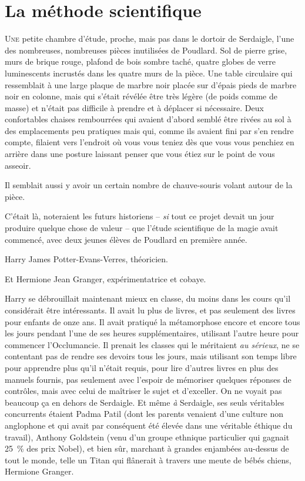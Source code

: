 \chapter{La méthode scientifique}

\lettrine{U}{ne} petite chambre d'étude, proche, mais pas dans le dortoir de Serdaigle, l'une des nombreuses, nombreuses pièces inutilisées de Poudlard.
Sol de pierre grise, murs de brique rouge, plafond de bois sombre taché, quatre globes de verre luminescents incrustés dans les quatre murs de la pièce.
Une table circulaire qui ressemblait à une large plaque de marbre noir placée sur d'épais pieds de marbre noir en colonne, mais qui s'était révélée être très légère (de poids comme de masse) et n'était pas difficile à prendre et à déplacer si nécessaire.
Deux confortables chaises rembourrées qui avaient d'abord semblé être rivées au sol à des emplacements peu pratiques mais qui, comme ils avaient fini par s'en rendre compte, filaient vers l'endroit où vous vous teniez dès que vous vous penchiez en arrière dans une posture laissant penser que vous étiez sur le point de vous asseoir.

Il semblait aussi y avoir un certain nombre de chauve-souris volant autour de la pièce.

C'était là, noteraient les futurs historiens -- \emph{si} tout ce projet devait un jour produire quelque chose de valeur -- que l'étude scientifique de la magie avait commencé, avec deux jeunes élèves de Poudlard en première année.

Harry James Potter-Evans-Verres, théoricien.

Et Hermione Jean Granger, expérimentatrice et cobaye.

Harry se débrouillait maintenant mieux en classe, du moins dans les cours qu'il considérait être intéressants.
Il avait lu plus de livres, et pas seulement des livres pour enfants de onze ans.
Il avait pratiqué la métamorphose encore et encore tous les jours pendant l'une de ses heures supplémentaires, utilisant l'autre heure pour commencer l'Occlumancie.
Il prenait les classes qui le méritaient \emph{au sérieux}, ne se contentant pas de rendre ses devoirs tous les jours, mais utilisant son temps libre pour apprendre plus qu'il n'était requis, pour lire d'autres livres en plus des manuels fournis, pas seulement avec l'espoir de mémoriser quelques réponses de contrôles, mais avec celui de maîtriser le sujet et d'exceller.
On ne voyait pas beaucoup ça en dehors de Serdaigle.
Et même \emph{à} Serdaigle, ses seuls véritables concurrents étaient Padma Patil (dont les parents venaient d'une culture non anglophone et qui avait par conséquent été élevée dans une véritable éthique du travail), Anthony Goldstein (venu d'un groupe ethnique particulier qui gagnait 25~\% des prix Nobel), et bien sûr, marchant à grandes enjambées au-dessus de tout le monde, telle un Titan qui flânerait à travers une meute de bébés chiens, Hermione Granger.

